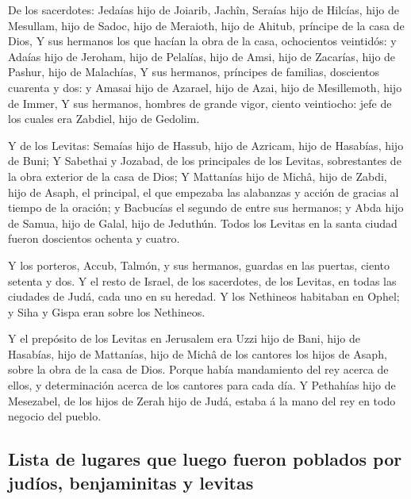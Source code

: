  De los sacerdotes: Jedaías hijo de Joiarib, Jachîn,
 Seraías hijo de Hilcías, hijo de Mesullam, hijo de Sadoc,
hijo de Meraioth, hijo de Ahitub, príncipe de la casa de Dios,
 Y sus hermanos los que hacían la obra de la casa,
ochocientos veintidós: y Adaías hijo de Jeroham, hijo de Pelalías, hijo
de Amsi, hijo de Zacarías, hijo de Pashur, hijo de Malachías,
 Y sus hermanos, príncipes de familias, doscientos cuarenta
y dos: y Amasai hijo de Azarael, hijo de Azai, hijo de Mesillemoth, hijo
de Immer,  Y sus hermanos, hombres de grande vigor, ciento
veintiocho: jefe de los cuales era Zabdiel, hijo de Gedolim.

 Y de los Levitas: Semaías hijo de Hassub, hijo de Azricam,
hijo de Hasabías, hijo de Buni;  Y Sabethai y Jozabad, de
los principales de los Levitas, sobrestantes de la obra exterior de la
casa de Dios;  Y Mattanías hijo de Michâ, hijo de Zabdi,
hijo de Asaph, el principal, el que empezaba las alabanzas y acción de
gracias al tiempo de la oración; y Bacbucías el segundo de entre sus
hermanos; y Abda hijo de Samua, hijo de Galal, hijo de Jeduthún.
 Todos los Levitas en la santa ciudad fueron doscientos
ochenta y cuatro.

 Y los porteros, Accub, Talmón, y sus hermanos, guardas en
las puertas, ciento setenta y dos.  Y el resto de Israel,
de los sacerdotes, de los Levitas, en todas las ciudades de Judá, cada
uno en su heredad.  Y los Nethineos habitaban en Ophel; y
Siha y Gispa eran sobre los Nethineos.

 Y el prepósito de los Levitas en Jerusalem era Uzzi hijo
de Bani, hijo de Hasabías, hijo de Mattanías, hijo de Michâ de los
cantores los hijos de Asaph, sobre la obra de la casa de Dios.
 Porque había mandamiento del rey acerca de ellos, y
determinación acerca de los cantores para cada día.  Y
Pethahías hijo de Mesezabel, de los hijos de Zerah hijo de Judá, estaba
á la mano del rey en todo negocio del pueblo.

\hypertarget{lista-de-lugares-que-luego-fueron-poblados-por-juduxedos-benjaminitas-y-levitas}{%
\subsection{Lista de lugares que luego fueron poblados por judíos,
benjaminitas y
levitas}\label{lista-de-lugares-que-luego-fueron-poblados-por-juduxedos-benjaminitas-y-levitas}}

